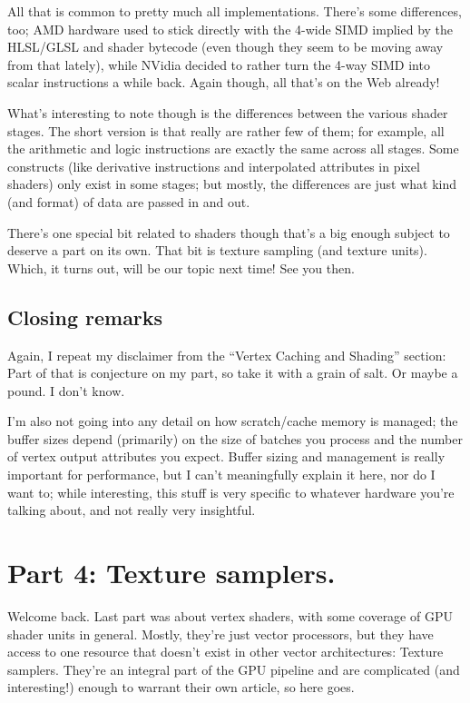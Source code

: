 \documentclass[12pt]{article}
\begin{document}
All that is common to pretty much all implementations.
There’s some differences, too; AMD hardware used to stick directly with the 4-wide SIMD implied by the HLSL/GLSL and shader bytecode (even though they seem to be moving away from that lately), while NVidia decided to rather turn the 4-way SIMD into scalar instructions a while back.
Again though, all that’s on the Web already!

What’s interesting to note though is the differences between the various shader stages.
The short version is that really are rather few of them; for example, all the arithmetic and logic instructions are exactly the same across all stages.
Some constructs (like derivative instructions and interpolated attributes in pixel shaders) only exist in some stages; but mostly, the differences are just what kind (and format) of data are passed in and out.

There’s one special bit related to shaders though that’s a big enough subject to deserve a part on its own.
That bit is texture sampling (and texture units).
Which, it turns out, will be our topic next time! See you then.

\subsection{Closing remarks}
\label{sec:orgbf35522}

Again, I repeat my disclaimer from the “Vertex Caching and Shading” section: Part of that is conjecture on my part, so take it with a grain of salt.
Or maybe a pound.
I don’t know.

I’m also not going into any detail on how scratch/cache memory is managed; the buffer sizes depend (primarily) on the size of batches you process and the number of vertex output attributes you expect.
Buffer sizing and management is really important for performance, but I can’t meaningfully explain it here, nor do I want to; while interesting, this stuff is very specific to whatever hardware you’re talking about, and not really very insightful.

\section{Part 4: Texture samplers.}
\label{sec:orga33a92a}
\label{part4}

Welcome back. Last part was about vertex shaders, with some coverage of GPU shader units in general. Mostly, they’re just vector processors, but they have access to one resource that doesn’t exist in other vector architectures: Texture samplers. They’re an integral part of the GPU pipeline and are complicated (and interesting!) enough to warrant their own article, so here goes.
\end{document}
